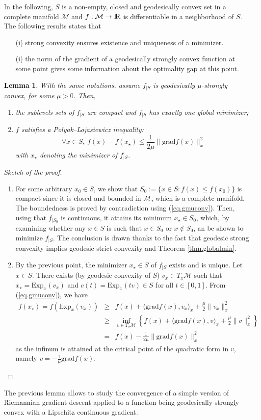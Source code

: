 \documentclass[10pt,a4paper]{book}
\theoremstyle{definition}
\theoremstyle{plain}
\newtheorem{lma}{Lemma}[section]
\theoremstyle{remark}
\newcommand{\grad}{\textrm{grad}}
\newcommand \M {\mathcal{M}}
\def\R{{\rm I\kern-0.16em R}}
\begin{document}
In the following, $S$ is a non-empty, closed and geodesically convex set in a complete manifold $\M$ and $f: \M\to \R$ is differentiable in a neighborhood of $S$. The following results states that 
\begin{itemize}
\item[(i)] strong convexity ensures existence and uniqueness of a minimizer. 
\item[(i)] the norm of the gradient of a geodesically strongly convex function at some point gives some information about the optimality gap at this point.
\end{itemize}
\begin{lma}With the same notations, assume $f_{\mid S}$ is geodesically $\mu$-strongly convex, for some $\mu>0$. Then,
\begin{enumerate}
\item the sublevels sets of $f_{\mid S}$ are compact and $f_{\mid S}$ has exactly one global minimizer;
\item $f$ satisfies a \emph{Polyak--Lojasiewicz} inequality:
$$\forall x \in S,~f(x)-f(x_{\star})\leq \frac{1}{2\mu}\|\grad f(x)\|_x^2$$
with $x_{\star}$ denoting the minimizer of $f_{\mid S}$.
\end{enumerate}
\end{lma}
\begin{proof}[Sketch of the proof]
\begin{enumerate}
\item For some arbitrary $x_0\in S$, we show that $S_0:=\{x\in S: f(x)\leq f(x_0)\}$ is compact since it is closed and bounded in $\M$, which is a complete manifold. The boundedness is proved by contradiction using (\ref{eq.gmuconv}). Then, using that $f_{\mid S_0}$ is continuous, it attains its minimum $x_{\star} \in S_0$, which, by examining whether any $x\in S$ is such that $x\in S_0$ or $x\not \in S_0$, an be shown to minimize $f_{\mid S}$. The conclusion is drawn thanks to the fact that geodesic strong convexity implies geodesic strict convexity and Theorem \ref{thm.globalmin}.
\item By the previous point, the minimizer $x_{\star}\in S$ of $f_{\mid S}$ exists and is unique. Let $x\in S$. There exists (by geodesic convexity of $S$) $v_x\in T_x\M$ such that $x_{\star}=\text{Exp}_x(v_x)$ and $c(t)=\text{Exp}_x(tv)\in S$ for all $t\in [0,1]$. From (\ref{eq.gmuconv}), we have
\begin{eqnarray*}
f(x_{\star})=f(\text{Exp}_x(v_x))&\ge&f(x)+\langle \grad f(x),v_x\rangle_x+\frac{\mu}{2}\|v_x\|_x^2\\
&\ge& \inf_{v\in T_x\M}\left\{f(x)+\langle \grad f(x),v\rangle_x+\frac{\mu}{2}\|v\|_x^2\right\}\\
&=&f(x)-\frac{1}{2\mu}\|\grad f(x)\|_x^2
\end{eqnarray*}
as the infinum is attained at the critical point of the quadratic form in $v$, namely $v=-\frac{1}{\mu}\grad f(x)$.
\end{enumerate}
\end{proof}
The previous lemma allows to study the convergence of a simple version of Riemannian gradient descent applied to a function being geodesically strongly convex with a Lipschitz continuous gradient. 
\end{document}
